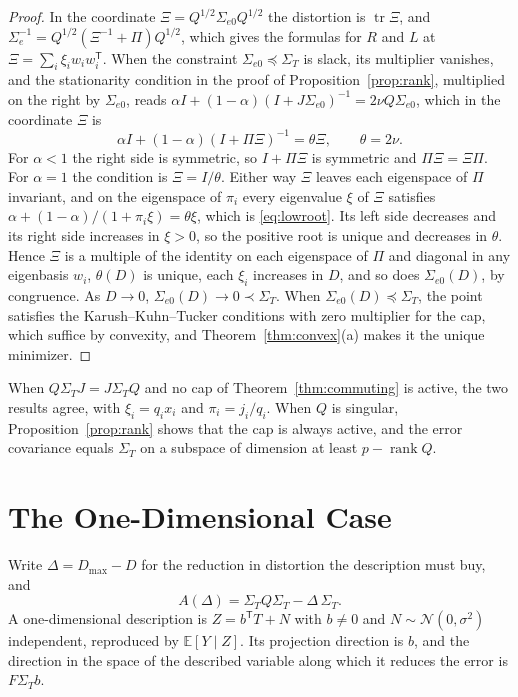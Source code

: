 \documentclass[11pt,onecolumn]{IEEEtran}
\newcommand{\E}{\mathbb{E}}
\newcommand{\tr}{\operatorname{tr}}
\newcommand{\Se}{\Sigma_{e}}
\newcommand{\Sez}{\Sigma_{e0}}
\begin{document}
\begin{proof}
In the coordinate $\Xi=Q^{1/2}\Sez Q^{1/2}$ the distortion is $\tr\Xi$,
and $\Se^{-1}=Q^{1/2}(\Xi^{-1}+\Pi)Q^{1/2}$, which gives the formulas for
$R$ and $L$ at $\Xi=\sum_i\xi_iw_iw_i^{\mathsf T}$. When the constraint
$\Sez\preceq\Sigma_T$ is slack, its multiplier vanishes, and the
stationarity condition in the proof of Proposition~\ref{prop:rank},
multiplied on the right by $\Sez$, reads
$\alpha I+(1-\alpha)(I+J\Sez)^{-1}=2\nu Q\Sez$, which in the coordinate
$\Xi$ is
\[
\alpha I+(1-\alpha)(I+\Pi\Xi)^{-1}=\theta\Xi,\qquad \theta=2\nu .
\]
For $\alpha<1$ the right side is symmetric, so $I+\Pi\Xi$ is symmetric
and $\Pi\Xi=\Xi\Pi$. For $\alpha=1$ the condition is $\Xi=I/\theta$.
Either way $\Xi$ leaves each eigenspace of $\Pi$ invariant, and on the
eigenspace of $\pi_i$ every eigenvalue $\xi$ of $\Xi$ satisfies
$\alpha+(1-\alpha)/(1+\pi_i\xi)=\theta\xi$, which is
\eqref{eq:lowroot}. Its left side decreases and its right side increases
in $\xi>0$, so the positive root is unique and decreases in $\theta$.
Hence $\Xi$ is a multiple of the identity on each eigenspace of $\Pi$
and diagonal in any eigenbasis $w_i$, $\theta(D)$ is unique, each
$\xi_i$ increases in $D$, and so does $\Sez(D)$, by congruence. As
$D\to0$, $\Sez(D)\to0\prec\Sigma_T$. When $\Sez(D)\preceq\Sigma_T$, the
point satisfies the Karush--Kuhn--Tucker conditions with zero multiplier
for the cap, which suffice by convexity, and
Theorem~\ref{thm:convex}(a) makes it the unique minimizer.
\end{proof}

When $Q\Sigma_TJ=J\Sigma_TQ$ and no cap of Theorem~\ref{thm:commuting} is
active, the two results agree, with $\xi_i=q_ix_i$ and $\pi_i=j_i/q_i$.
When $Q$ is singular, Proposition~\ref{prop:rank} shows that the cap is
always active, and the error covariance equals $\Sigma_T$ on a subspace
of dimension at least $p-\operatorname{rank}Q$.

\section{The One-Dimensional Case}
\label{sec:onedim}

Write $\Delta=D_{\max}-D$ for the reduction in distortion the description
must buy, and
\[
A(\Delta)=\Sigma_TQ\Sigma_T-\Delta\,\Sigma_T .
\]
A one-dimensional description is $Z=b^{\mathsf T}T+N$ with $b\ne0$ and
$N\sim\mathcal N(0,\sigma^2)$ independent, reproduced by $\E[Y\mid Z]$.
Its projection direction is $b$, and the direction in the space of the
described variable along which it reduces the error is $F\Sigma_Tb$.
\end{document}
